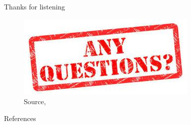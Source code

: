 \documentclass{beamer}
\begin{document}
	
	\begin{frame}{Thanks for listening}
		\begin{figure}
			\includegraphics[width=0.6\linewidth]{any-questions.jpg}
			\caption{Source, \citet{any-Qs}}
		\end{figure}

	\end{frame}

	\begin{frame}{References}
		\tiny
		
	\end{frame}
\end{document}
